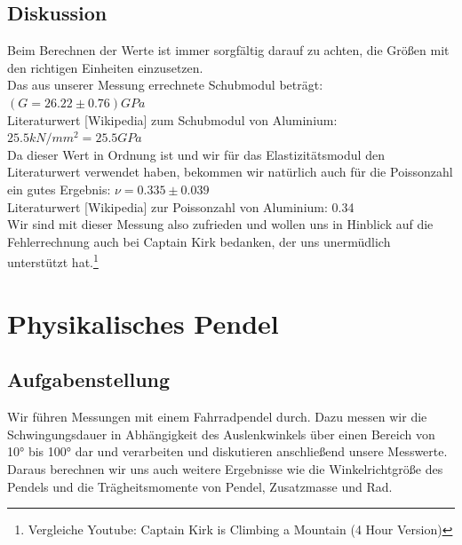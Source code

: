 \documentclass{article}
\begin{document}
\subsection{Diskussion}
Beim Berechnen der Werte ist immer sorgfältig darauf zu achten, die Größen mit den richtigen Einheiten einzusetzen.\\
Das aus unserer Messung errechnete Schubmodul beträgt:\\
$(G=26.22 \pm 0.76) GPa$\\
Literaturwert [Wikipedia] zum Schubmodul von Aluminium: $25.5 kN/mm^2 = 25.5 GPa$\\
Da dieser Wert in Ordnung ist und wir für das Elastizitätsmodul den Literaturwert verwendet haben, bekommen wir natürlich auch für die Poissonzahl ein gutes Ergebnis: $\nu = 0.335 \pm 0.039$\\
Literaturwert [Wikipedia] zur Poissonzahl von Aluminium: 0.34\\
Wir sind mit dieser Messung also zufrieden und wollen uns in Hinblick auf die Fehlerrechnung auch bei Captain Kirk  bedanken, der uns unermüdlich unterstützt hat.\footnote{Vergleiche Youtube: Captain Kirk is Climbing a Mountain (4 Hour Version)}
\newpage
\section{Physikalisches Pendel}
\subsection{Aufgabenstellung}
Wir führen Messungen mit einem Fahrradpendel durch. Dazu messen wir die Schwingungsdauer in Abhängigkeit des Auslenkwinkels über einen Bereich von 10° bis 100° dar und verarbeiten und diskutieren anschließend unsere Messwerte. 
Daraus berechnen wir uns auch weitere Ergebnisse wie die Winkelrichtgröße des Pendels und die Trägheitsmomente von Pendel, Zusatzmasse und Rad. 
\end{document}
